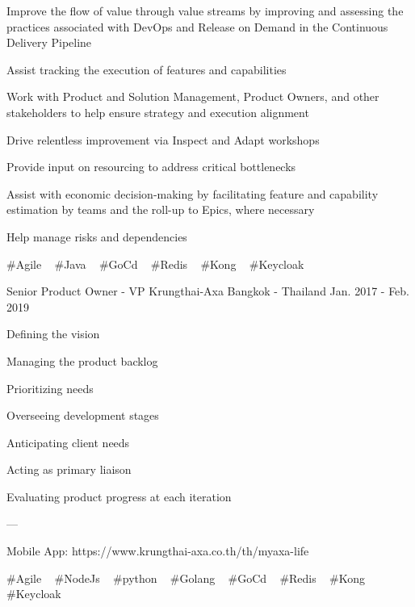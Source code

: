 \begin{cventries}
{\begin{cvitems}
        \item {Improve the flow of value through value streams by improving and assessing the practices associated with DevOps and Release on Demand in the Continuous Delivery Pipeline}
        \item {Assist tracking the execution of features and capabilities}
        \item {Work with Product and Solution Management, Product Owners, and other stakeholders to help ensure strategy and execution alignment}
        \item {Drive relentless improvement via Inspect and Adapt workshops}
        \item {Provide input on resourcing to address critical bottlenecks}
        \item {Assist with economic decision-making by facilitating feature and capability estimation by teams and the roll-up to Epics, where necessary}
        \item {Help manage risks and dependencies}
      \end{cvitems}
    }
    {
      \#Agile ~
      \#Java ~
      \#GoCd ~
      \#Redis ~
      \#Kong ~
      \#Keycloak ~
    }

  \cventry
    {Senior Product Owner - VP} %
    {Krungthai-Axa} %
    {Bangkok - Thailand} %
    {Jan. 2017 - Feb. 2019} %
    {
      \begin{cvitems} %
        \item {Defining the vision}
        \item {Managing the product backlog}
        \item {Prioritizing needs}
        \item {Overseeing development stages}
        \item {Anticipating client needs}
        \item {Acting as primary liaison}
        \item {Evaluating product progress at each iteration}
        \item {---}
        \item {Mobile App: https://www.krungthai-axa.co.th/th/myaxa-life}
      \end{cvitems}
    }
    {
      \#Agile ~
      \#NodeJs ~
      \#python ~
      \#Golang ~
      \#GoCd ~
      \#Redis ~
      \#Kong ~
      \#Keycloak ~
    }


\end{cventries}
